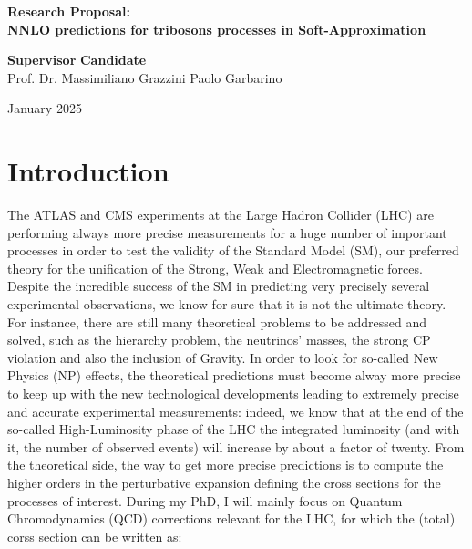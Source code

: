 \documentclass[a4paper, 11pt]{article}
\begin{document}
\begin{center}
    {\Large
    \textbf{Research Proposal:}\\
    \vspace*{0.3cm}
    \textbf{NNLO predictions for tribosons processes in Soft-Approximation}}\\
    \vspace*{0.5cm}
    {\begin{minipage}{0.85\textwidth}
    \begin{flushleft}
    \textbf{Supervisor} \hfill \textbf{Candidate}\\
    Prof. Dr. Massimiliano Grazzini \hfill Paolo Garbarino\\
    \end{flushleft}
    \end{minipage}}
    \vspace*{1cm}
    \newline January 2025
\end{center}

\section{Introduction}
The ATLAS and CMS experiments at the Large Hadron Collider (LHC) are performing always more precise measurements for a huge number of important processes in order to test the validity of the Standard Model (SM), our preferred theory for the unification of the Strong, Weak and Electromagnetic forces.
Despite the incredible success of the SM in predicting very precisely several experimental observations, we know for sure that it is not the ultimate theory. For instance, there are still many theoretical problems to be addressed and solved, such as the hierarchy problem, 
the neutrinos' masses, the strong CP violation and also the inclusion of Gravity.
In order to look for so-called New Physics (NP) effects, the theoretical predictions must become alway more precise to keep up with the new technological developments leading to extremely precise and accurate experimental measurements: indeed, we know that at the end of 
the so-called High-Luminosity phase of the LHC the integrated luminosity (and with it, the number of observed events) will increase by about a factor of twenty.
From the theoretical side, the way to get more precise predictions is to compute the higher orders in the perturbative expansion defining the cross sections for the processes of interest. During my PhD, I will mainly focus on Quantum Chromodynamics (QCD) corrections relevant
for the LHC, for which the (total) corss section can be written as:
\end{document}
